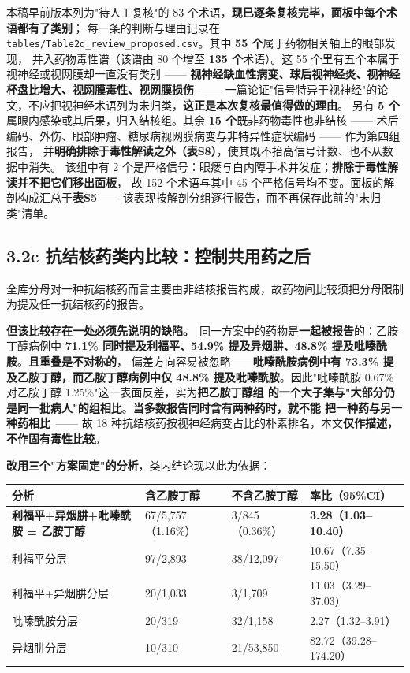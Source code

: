 \documentclass[UTF8,fontset=windows,11pt]{ctexart}
\begin{document}
本稿早前版本列为"待人工复核"的 83 个术语，\textbf{现已逐条复核完毕，面板中每个术语都有了类别}； 每一条的判断与理由记录在 \texttt{tables/Table2d\_review\_proposed.csv}。其中 \textbf{55 个}属于药物相关轴上的眼部发现， 并入药物毒性谱（该谱由 80 个增至 \textbf{135 个}术语）。这 55 个里有五个本属于视神经或视网膜却一直没有类别 —— \textbf{视神经缺血性病变、球后视神经炎、视神经杯盘比增大、视网膜毒性、视网膜损伤}\ —— 一篇论证"信号特异于视神经"的论文，不应把视神经术语列为未归类，\textbf{这正是本次复核最值得做的理由}。 另有 \textbf{5 个}属眼内感染或其后果，归入结核组。其余 \textbf{15 个}既非药物毒性也非结核 —— 术后编码、外伤、眼部肿瘤、糖尿病视网膜病变与非特异性症状编码 —— 作为第四组报告， 并\textbf{明确排除于毒性解读之外（表S8）}，使其既不抬高信号计数、也不从数据中消失。 该组中有 2 个是严格信号：眼瘘与白内障手术并发症；\textbf{排除于毒性解读并不把它们移出面板}， 故 152 个术语与其中 45 个严格信号均不变。面板的解剖构成汇总于\textbf{表S5}—— 该表现按解剖分组逐行报告，而不再保存此前的"未归类"清单。

\subsection{3.2c 抗结核药类内比较：控制共用药之后}

全库分母对一种抗结核药而言主要由非结核报告构成，故药物间比较须把分母限制为提及任一抗结核药的报告。

\textbf{但该比较存在一处必须先说明的缺陷。}\ 同一方案中的药物是\textbf{一起被报告}的：乙胺丁醇病例中 \textbf{71.1\% 同时提及利福平、54.9\% 提及异烟肼、48.8\% 提及吡嗪酰胺}。\textbf{且重叠是不对称的}， 偏差方向容易被忽略——\textbf{吡嗪酰胺病例中有 73.3\% 提及乙胺丁醇，而乙胺丁醇病例中仅 48.8\% 提及吡嗪酰胺}。因此"吡嗪酰胺 0.67\% 对乙胺丁醇 1.25\%"这一表面反差，实为\textbf{把乙胺丁醇组 的一个大子集与"大部分仍是同一批病人"的组相比}。\textbf{当多数报告同时含有两种药时，就不能 把一种药与另一种药相比}\ —— 故 18 种抗结核药按视神经病变占比的朴素排名，本文\textbf{仅作描述， 不作固有毒性比较}。

\textbf{改用三个"方案固定"的分析}，类内结论现以此为依据：

\begin{center}
\small
\begin{longtable}{p{}p{}p{}p{}}
\hline
分析 & 含乙胺丁醇 & 不含乙胺丁醇 & 率比（95\%CI） \\
\hline
\textbf{利福平+异烟肼+吡嗪酰胺 ± 乙胺丁醇} & 67/5,757（1.16\%） & 3/845（0.36\%） & \textbf{3.28（1.03–10.40）} \\
利福平分层 & 97/2,893 & 38/12,097 & 10.67（7.35–15.50） \\
利福平+异烟肼分层 & 20/1,033 & 3/1,709 & 11.03（3.29–37.03） \\
吡嗪酰胺分层 & 20/319 & 32/1,158 & 2.27（1.32–3.91） \\
异烟肼分层 & 10/310 & 21/53,850 & 82.72（39.28–174.20） \\
\hline
\end{longtable}
\end{center}
\end{document}
